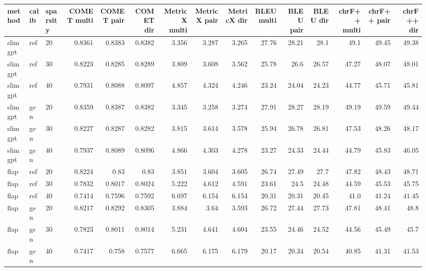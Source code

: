 \begin{tabular}{lllrrrrrrrrrrrr}
\toprule
method & calib & sparsity & COMET multi & COMET pair & COMET dir & MetricX multi & MetricX pair & MetricX dir & BLEU multi & BLEU pair & BLEU dir & chrF++ multi & chrF++ pair & chrF++ dir \\
\midrule
slimgpt & ref & 20 & 0.8361 & 0.8383 & 0.8382 & 3.356 & 3.287 & 3.265 & 27.76 & 28.21 & 28.1 & 49.1 & 49.45 & 49.38 \\
slimgpt & ref & 30 & 0.8223 & 0.8285 & 0.8289 & 3.809 & 3.608 & 3.562 & 25.78 & 26.6 & 26.57 & 47.27 & 48.07 & 48.01 \\
slimgpt & ref & 40 & 0.7931 & 0.8088 & 0.8097 & 4.857 & 4.324 & 4.246 & 23.24 & 24.04 & 24.23 & 44.77 & 45.71 & 45.81 \\
slimgpt & gen & 20 & 0.8359 & 0.8387 & 0.8382 & 3.345 & 3.258 & 3.274 & 27.91 & 28.27 & 28.19 & 49.19 & 49.59 & 49.44 \\
slimgpt & gen & 30 & 0.8227 & 0.8287 & 0.8282 & 3.815 & 3.614 & 3.578 & 25.94 & 26.78 & 26.81 & 47.53 & 48.26 & 48.17 \\
slimgpt & gen & 40 & 0.7937 & 0.8089 & 0.8096 & 4.866 & 4.303 & 4.278 & 23.27 & 24.33 & 24.44 & 44.79 & 45.83 & 46.05 \\
flap & ref & 20 & 0.8224 & 0.83 & 0.83 & 3.851 & 3.604 & 3.605 & 26.74 & 27.49 & 27.7 & 47.82 & 48.43 & 48.71 \\
flap & ref & 30 & 0.7832 & 0.8017 & 0.8024 & 5.222 & 4.612 & 4.591 & 23.61 & 24.5 & 24.48 & 44.59 & 45.53 & 45.75 \\
flap & ref & 40 & 0.7414 & 0.7596 & 0.7592 & 6.697 & 6.154 & 6.154 & 20.31 & 20.31 & 20.45 & 41.0 & 41.24 & 41.45 \\
flap & gen & 20 & 0.8217 & 0.8292 & 0.8305 & 3.884 & 3.64 & 3.593 & 26.72 & 27.44 & 27.73 & 47.81 & 48.41 & 48.8 \\
flap & gen & 30 & 0.7823 & 0.8011 & 0.8014 & 5.231 & 4.641 & 4.604 & 23.55 & 24.46 & 24.52 & 44.56 & 45.49 & 45.7 \\
flap & gen & 40 & 0.7417 & 0.758 & 0.7577 & 6.665 & 6.175 & 6.179 & 20.17 & 20.34 & 20.54 & 40.85 & 41.31 & 41.53 \\
\bottomrule
\end{tabular}
